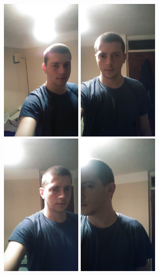 \documentclass{article}
\begin{document}
\begin{figure}[H]
	\centering
	\includegraphics[width=4cm]{face1.jpg}
\includegraphics[width=4cm]{face2.jpg}
\includegraphics[width=4cm]{face3.jpg}
\includegraphics[width=4cm]{face4.jpg}
	
\end{figure}
\end{document}

